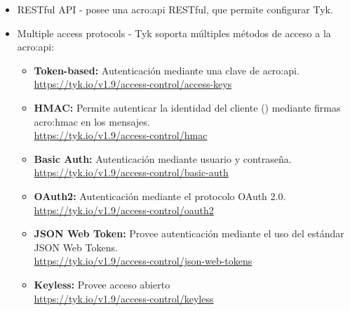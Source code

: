 \begin{itemize}
  \item RESTful API - posee una \gls{acro:api} RESTful, que permite configurar Tyk.
  \item Multiple access protocols - Tyk soporta múltiples métodos de acceso a la \gls{acro:api}:
  \begin{itemize}
    \item \textbf{Token-based:} Autenticación mediante una clave de \gls{acro:api}. \\
    \url{https://tyk.io/v1.9/access-control/access-keys}
    \item \textbf{HMAC:} Permite autenticar la identidad del cliente () mediante firmas \gls{acro:hmac} en los mensajes. \\
    \url{https://tyk.io/v1.9/access-control/hmac}
    \item \textbf{Basic Auth:} Autenticación mediante usuario y contraseña. \\
    \url{https://tyk.io/v1.9/access-control/basic-auth}
    \item \textbf{OAuth2:} Autenticación mediante el protocolo OAuth 2.0. \\
    \url{https://tyk.io/v1.9/access-control/oauth2}
    \item \textbf{JSON Web Token:} Provee autenticación mediante el uso del estándar JSON Web Tokens. \\
    \url{https://tyk.io/v1.9/access-control/json-web-tokens}
    \item \textbf{Keyless:} Provee acceso abierto \\
    \url{https://tyk.io/v1.9/access-control/keyless}
  \end{itemize}


\end{itemize}
